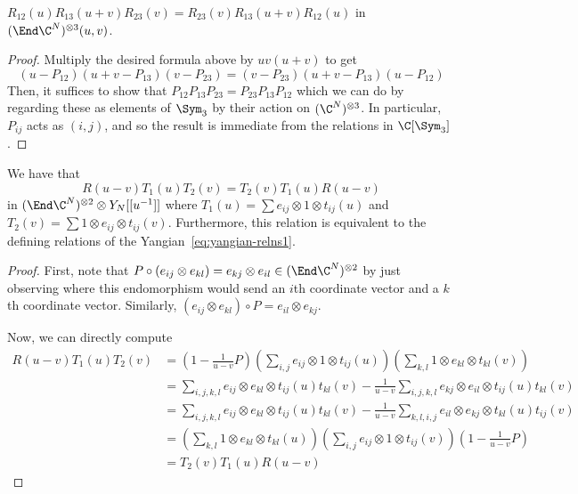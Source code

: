 \documentclass[11pt,leqno,oneside]{amsbook}
\numberwithin{thm}{section}
\begin{document}
\begin{prop}
  \(R_{12}(u)R_{13}(u+v)R_{23}(v) = R_{23}(v)R_{13}(u+v)R_{12}(u)\) in
  \((\End \C^N)^{\otimes 3}(u,v)\).
\end{prop}
\begin{proof}
  Multiply the desired formula above by \(uv(u+v)\) to get \[
    (u-P_{12})(u+v-P_{13})(v-P_{23}) = (v-P_{23})(u+v-P_{13})(u-P_{12})
  \]
  Then, it suffices to show that \(P_{12}P_{13}P_{23} =
  P_{23}P_{13}P_{12}\) which we can do by regarding these as elements
  of \(\Sym_3\) by their action on \((\C^N)^{\otimes 3}\). In
  particular, \(P_{ij}\) acts as \((i,j)\), and so the result is
  immediate from the relations in \(\C[\Sym_3]\).
\end{proof}
\begin{thm}
  We have that 
  \[
    R(u-v)T_1(u)T_2(v) = T_2(v)T_1(u)R(u-v)
  \] in \((\End
  \C^N)^{\otimes 2} \otimes Y_N[[u^{-1}]]\) where \(T_1(u) = \sum
  e_{ij} \otimes 1 \otimes t_{ij}(u)\) and \(T_2(v) = \sum 1 \otimes
  e_{ij} \otimes t_{ij}(v)\). Furthermore, this relation is equivalent
  to the defining relations of the Yangian~\ref{eq:yangian-relns1}.
\end{thm}
\begin{proof}
  First, note that \(P \circ (e_{ij} \otimes e_{kl}) = e_{kj} \otimes
  e_{il} \in (\End \C^N)^{\otimes 2}\) by just observing where this
  endomorphism would send an \(i\)th coordinate vector and a \(k\)th
  coordinate vector. Similarly, \((e_{ij} \otimes e_{kl}) \circ P =
  e_{il} \otimes e_{kj}\).
  
  Now, we can directly compute
  \begin{align*}
    R(u-v)T_1(u)T_2(v)
    & = \left( 1-\frac{1}{u-v}P \right)\left( \sum_{i,j} e_{ij}
      \otimes 1 \otimes t_{ij}(u) \right) \left( \sum_{k,l} 1 \otimes
      e_{kl} \otimes t_{kl}(v) \right) \\
    & = \sum_{i,j,k,l} e_{ij} \otimes e_{kl} \otimes t_{ij}(u)t_{kl}(v) -
      \frac{1}{u-v} \sum_{i,j,k,l} e_{kj} \otimes e_{il} \otimes
      t_{ij}(u)t_{kl}(v)\\
    & = \sum_{i,j,k,l} e_{ij} \otimes e_{kl} \otimes t_{ij}(u)t_{kl}(v) -
      \frac{1}{u-v} \sum_{k,l,i,j} e_{il} \otimes e_{kj} \otimes
      t_{kl}(u)t_{ij}(v)\\
    & = \left( \sum_{k,l} 1 \otimes
      e_{kl} \otimes t_{kl}(u) \right) \left( \sum_{i,j} e_{ij}
      \otimes 1 \otimes t_{ij}(v) \right) \left( 1-\frac{1}{u-v}P
      \right) \\
    & = T_2(v)T_1(u)R(u-v)
  \end{align*}
\end{proof}
\end{document}
